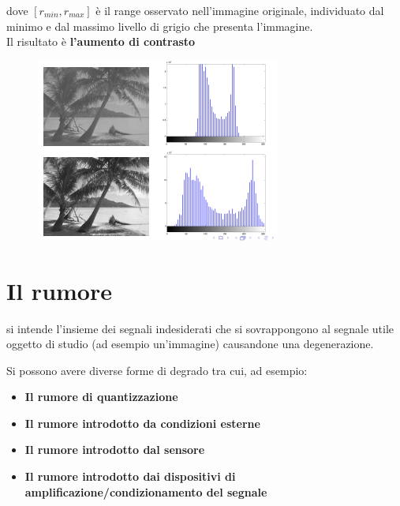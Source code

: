 dove $[r_{min}, r_{max} ]$ è il range osservato nell'immagine originale,
individuato dal minimo e dal massimo livello di grigio che presenta l'immagine.
\\Il risultato è \textbf{l'aumento di contrasto}

\begin{figure}[H]
    \centering
    \includegraphics[width=\linewidth, keepaspectratio]{capitoli/immagini/imgs/stretch-isto.png}
\end{figure}

\section{Il rumore}

\begin{definition}
    si intende l'insieme dei segnali indesiderati che si sovrappongono al segnale utile oggetto di studio (ad esempio un'immagine) causandone una degenerazione.
\end{definition}
Si possono avere diverse forme di degrado tra cui, ad esempio:
\begin{itemize}
    \item \textbf{Il rumore di quantizzazione}
    \item \textbf{Il rumore introdotto da condizioni esterne}
    \item \textbf{Il rumore introdotto dal sensore}
    \item \textbf{Il rumore introdotto dai dispositivi di amplificazione/condizionamento del segnale}
\end{itemize}

